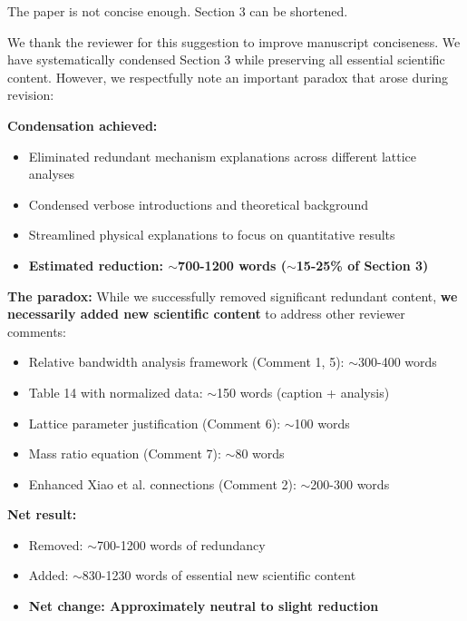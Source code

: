 \documentclass[11pt,a4paper]{article}
\newenvironment{reviewerbox}{%
    \par\medskip\noindent{\color{reviewercolor}\rule{\linewidth}{2pt}}\par
    \noindent{\color{reviewercolor}\bfseries Reviewer Comment}\par\smallskip
}{%
    \par\noindent{\color{reviewercolor}\rule{\linewidth}{0.5pt}}\medskip
}
\newenvironment{responsebox}{%
    \par\medskip\noindent{\color{responsecolor}\rule{\linewidth}{2pt}}\par
    \noindent{\color{responsecolor}\bfseries Response}\par\smallskip
}{%
    \par\noindent{\color{responsecolor}\rule{\linewidth}{0.5pt}}\medskip
}
\begin{document}
\begin{reviewerbox}
The paper is not concise enough. Section 3 can be shortened.
\end{reviewerbox}

\begin{responsebox}
We thank the reviewer for this suggestion to improve manuscript conciseness. We have systematically condensed Section 3 while preserving all essential scientific content. However, we respectfully note an important paradox that arose during revision:

\textbf{Condensation achieved:}
\begin{itemize}
    \item Eliminated redundant mechanism explanations across different lattice analyses
    \item Condensed verbose introductions and theoretical background
    \item Streamlined physical explanations to focus on quantitative results
    \item \textbf{Estimated reduction: $\sim$700-1200 words ($\sim$15-25\% of Section 3)}
\end{itemize}

\textbf{The paradox:} While we successfully removed significant redundant content, \textbf{we necessarily added new scientific content} to address other reviewer comments:
\begin{itemize}
    \item Relative bandwidth analysis framework (Comment 1, 5): $\sim$300-400 words
    \item Table 14 with normalized data: $\sim$150 words (caption + analysis)
    \item Lattice parameter justification (Comment 6): $\sim$100 words
    \item Mass ratio equation (Comment 7): $\sim$80 words
    \item Enhanced Xiao et al. connections (Comment 2): $\sim$200-300 words
\end{itemize}

\textbf{Net result:}
\begin{itemize}
    \item Removed: $\sim$700-1200 words of redundancy
    \item Added: $\sim$830-1230 words of essential new scientific content
    \item \textbf{Net change: Approximately neutral to slight reduction}
\end{itemize}


\end{responsebox}
\end{document}
